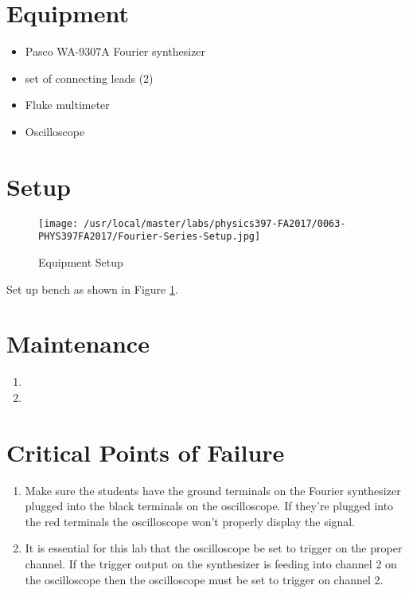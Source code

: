 \section{Equipment}

\begin{minipage}[t]{0.7\textwidth}
\begin{itemize}[noitemsep]
\item Pasco WA-9307A Fourier synthesizer
\item set of connecting leads (2)
\end{itemize}
\end{minipage}
\begin{minipage}[t]{0.3\textwidth}
\begin{itemize}[noitemsep]
\item Fluke multimeter
\item Oscilloscope
\end{itemize}
\end{minipage}

\section{Setup}
\begin{figure}
\texttt{[image: /usr/local/master/labs/physics397-FA2017/0063-PHYS397FA2017/Fourier-Series-Setup.jpg]}
\caption{Equipment Setup}
\label{pic:FSsetup}
\end{figure}

Set up bench as shown in Figure \ref{pic:FSsetup}.

\section{Maintenance}

\begin{enumerate}
\item 
\item 
\end{enumerate}

\section{Critical Points of Failure}

\begin{enumerate}

\item Make sure the students have the ground terminals on the Fourier synthesizer plugged into the black terminals on the oscilloscope. If they're plugged into the red terminals the oscilloscope won't properly display the signal.

\item It is essential for this lab that the oscilloscope be set to trigger on the proper channel. If the trigger output on the synthesizer is feeding into channel 2 on the oscilloscope then the oscilloscope must be set to trigger on channel 2.

\end{enumerate}


